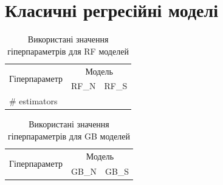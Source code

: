 \documentclass[10pt,a5paper,titlepage,oneside]{book}
\numberwithin{equation}{part}
\begin{document}
\section{Класичні регресійні моделі}


\begin{table}
\caption{Використані значення гіперпараметрів для RF моделей}
\label{tblRFrez}
\centering
\begin{tabular}{|l|c|c|}
\hline
\multirow{2}{*}{Гіперпараметр} & \multicolumn{2}{c|}{Модель} \\
\cline{2-3}
&RF\_N&RF\_S \rule{0pt}{11pt}\\
\hline
\# estimators&	\\
\hline
\hline
\end{tabular}
\end{table}


\begin{table}[!ht]
\caption{Використані значення гіперпараметрів для GB моделей}
\label{tblGBrez}
\centering
\begin{tabular}{|l|c|c|}
\hline
\multirow{2}{*}{Гіперпараметр} & \multicolumn{2}{c|}{Модель} \\
\cline{2-3}
&GB\_N&GB\_S \rule{0pt}{11pt}\\
\hline
\hline
\end{tabular}
\end{table}
\end{document}
